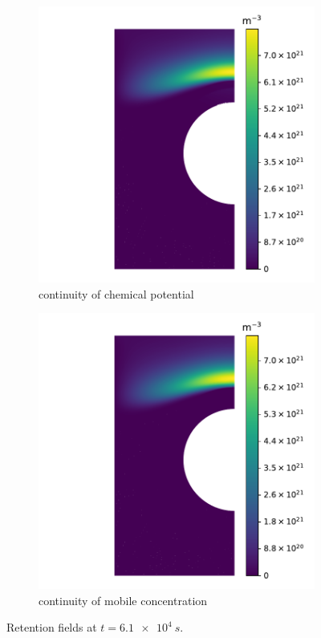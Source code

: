 \begin{figure}
    \centering
    \begin{subfigure}{0.5\linewidth}
        \includegraphics[width=\linewidth]{Figures/Chapter3/monoblocks/interface_condition/retention_chemical_pot_short_exposure.pdf}
        \caption{continuity of chemical potential}
    \end{subfigure}%
    \begin{subfigure}{0.5\linewidth}
        \includegraphics[width=\linewidth]{Figures/Chapter3/monoblocks/interface_condition/retention_concentration_short_exposure.pdf}
        \caption{continuity of mobile concentration}
    \end{subfigure}
    \caption{Retention fields at $t=\SI{6.1e4}{s}$.}
\end{figure}


